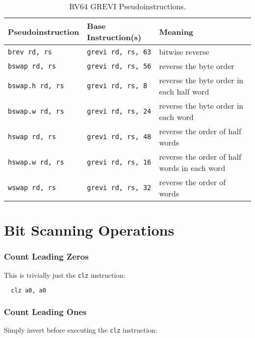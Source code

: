 \begin{table}[h]
\begin{small}
\begin{center}
\begin{tabular}{l l l}
Pseudoinstruction & Base Instruction(s) & Meaning \\ \hline

{\tt brev rd, rs} & {\tt grevi rd, rs, 63} & bitwise reverse \\
{\tt bswap rd, rs} & {\tt grevi rd, rs, 56} & reverse the byte order \\
{\tt bswap.h rd, rs} & {\tt grevi rd, rs, 8} & reverse the byte order in each half word \\
{\tt bswap.w rd, rs} & {\tt grevi rd, rs, 24} & reverse the byte order in each word \\
{\tt hswap rd, rs} & {\tt grevi rd, rs, 48} & reverse the order of half words \\
{\tt hswap.w rd, rs} & {\tt grevi rd, rs, 16} & reverse the order of half words in each word \\
{\tt wswap rd, rs} & {\tt grevi rd, rs, 32} & reverse the order of words \\
\hline

\end{tabular}
\end{center}
\end{small}
\caption{RV64 GREVI Pseudoinstructions.}
\label{pseudos-grevi64}
\end{table}

\section{Bit Scanning Operations}

\subsubsection{Count Leading Zeros}

This is trivially just the \texttt{clz} instruction:

\begin{verbatim}
  clz a0, a0
\end{verbatim}

\subsubsection{Count Leading Ones}

Simply invert before executing the \texttt{clz} instruction:

